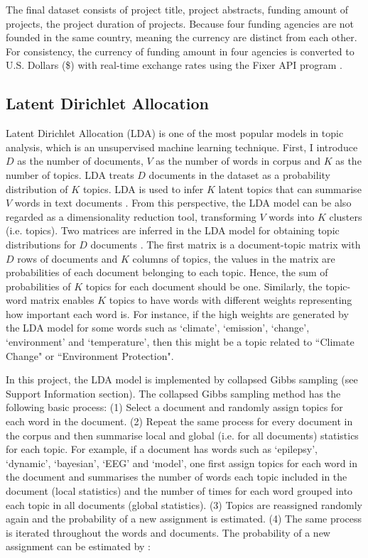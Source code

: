 The final dataset consists of project title, project abstracts, funding amount of projects, the project duration of projects. Because four funding agencies are not founded in the same country, meaning the currency are distinct from each other. For consistency, the currency of funding amount in four agencies is converted to U.S. Dollars (\$) with real-time exchange rates using the Fixer API program \cite{fixer}.

\subsection{Latent Dirichlet Allocation}

Latent Dirichlet Allocation (LDA) is one of the most popular models in topic analysis, which is an unsupervised machine learning technique. First, I introduce $D$ as the number of documents, $V$ as the number of words in corpus and $K$ as the number of topics. LDA treats $D$ documents in the dataset as a probability distribution of $K$ topics. LDA is used to infer $K$ latent topics that can summarise $V$ words in text documents \cite{sseutm}. From this perspective, the LDA model can be also regarded as a dimensionality reduction tool, transforming $V$ words into $K$ clusters (i.e. topics). Two matrices are inferred in the LDA model for obtaining topic distributions for $D$ documents \cite{LDA}. The first matrix is a document-topic matrix with $D$ rows of documents and $K$ columns of topics, the values in the matrix are probabilities of each document belonging to each topic. Hence, the sum of probabilities of $K$ topics for each document should be one. Similarly, the topic-word matrix enables $K$ topics to have words with different weights representing how important each word is. For instance, if the high weights are generated by the LDA model for some words such as `climate', `emission', `change', `environment' and `temperature', then this might be a topic related to ``Climate Change" or ``Environment Protection".

In this project, the LDA model is implemented by collapsed Gibbs sampling (see Support Information section). The collapsed Gibbs sampling method has the following basic process: (1) Select a document and randomly assign topics for each word in the document. (2) Repeat the same process for every document in the corpus and then summarise local and global (i.e. for all documents) statistics for each topic. For example, if a document has words such as `epilepsy', `dynamic', `bayesian', `EEG' and `model', one ﬁrst assign topics for each word in the document and summarises the number of words each topic included in the document (local statistics) and the number of times for each word grouped into each topic in all documents (global statistics). (3) Topics are reassigned randomly again and the probability of a new assignment is estimated. (4) The same process is iterated throughout the words and documents. The probability of a new assignment can be estimated by \cite{gibbs_lda}:

